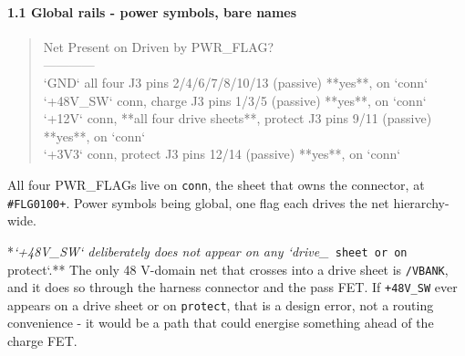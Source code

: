 \documentclass[11pt,a4paper]{article}
\begin{document}
\paragraph*{1.1 Global rails - power symbols, bare names}
\begin{quote}\small\ttfamily\raggedright
\textbar{} Net \textbar{} Present on \textbar{} Driven by \textbar{} PWR\_FLAG? \textbar{}\\
\textbar{}---\textbar{}---\textbar{}---\textbar{}---\textbar{}\\
\textbar{} `GND` \textbar{} all four \textbar{} J3 pins 2/4/6/7/8/10/13 (passive) \textbar{} {*}{*}yes{*}{*}, on `conn` \textbar{}\\
\textbar{} `+48V\_SW` \textbar{} conn, charge \textbar{} J3 pins 1/3/5 (passive) \textbar{} {*}{*}yes{*}{*}, on `conn` \textbar{}\\
\textbar{} `+12V` \textbar{} conn, {*}{*}all four drive sheets{*}{*}, protect \textbar{} J3 pins 9/11 (passive) \textbar{} {*}{*}yes{*}{*}, on `conn` \textbar{}\\
\textbar{} `+3V3` \textbar{} conn, protect \textbar{} J3 pins 12/14 (passive) \textbar{} {*}{*}yes{*}{*}, on `conn` \textbar{}
\end{quote}
All four PWR\_FLAGs live on \texttt{conn}, the sheet that owns the connector, at \texttt{\#FLG0100+}. Power symbols being global, one flag each drives the net hierarchy-wide.

{*}\emph{`+48V\_SW` deliberately does not appear on any `drive\_}\texttt{ sheet or on }protect`.{*}{*} The only 48 V-domain net that crosses into a drive sheet is \texttt{/VBANK}, and it does so through the harness connector and the pass FET. If \texttt{+48V\_SW} ever appears on a drive sheet or on \texttt{protect}, that is a design error, not a routing convenience - it would be a path that could energise something ahead of the charge FET.
\end{document}
